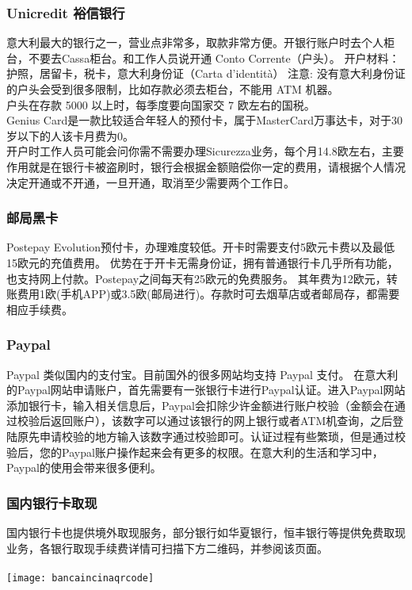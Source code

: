 \subsubsection{Unicredit 裕信银行}
意大利最大的银行之一，营业点非常多，取款非常方便。开银行账户时去个人柜台，不要去Cassa柜台。和工作人员说开通 Conto Corrente（户头）。
开户材料：护照，居留卡，税卡，意大利身份证（Carta d'identità）
注意:
没有意大利身份证的户头会受到很多限制，比如存款必须去柜台，不能用 ATM 机器。\\
户头在存款 5000 以上时，每季度要向国家交 7 欧左右的国税。\\
Genius Card是一款比较适合年轻人的预付卡，属于MasterCard万事达卡，对于30岁以下的人该卡月费为0。\\
开户时工作人员可能会问你需不需要办理Sicurezza业务，每个月14.8欧左右，主要作用就是在银行卡被盗刷时，银行会根据金额赔偿你一定的费用，请根据个人情况决定开通或不开通，一旦开通，取消至少需要两个工作日。 
\subsubsection{邮局黑卡}

Postepay Evolution预付卡，办理难度较低。开卡时需要支付5欧元卡费以及最低15欧元的充值费用。
优势在于开卡无需身份证，拥有普通银行卡几乎所有功能，也支持网上付款。Postepay之间每天有25欧元的免费服务。
其年费为12欧元，转账费用1欧(手机APP)或3.5欧(邮局进行)。存款时可去烟草店或者邮局存，都需要相应手续费。

\subsubsection{Paypal}

Paypal 类似国内的支付宝。目前国外的很多网站均支持 Paypal 支付。
在意大利的Paypal网站申请账户，首先需要有一张银行卡进行Paypal认证。进入Paypal网站添加银行卡，输入相关信息后，Paypal会扣除少许金额进行账户校验（金额会在通过校验后返回账户），该数字可以通过该银行的网上银行或者ATM机查询，之后登陆原先申请校验的地方输入该数字通过校验即可。认证过程有些繁琐，但是通过校验后，您的Paypal账户操作起来会有更多的权限。在意大利的生活和学习中，Paypal的使用会带来很多便利。

\subsubsection{国内银行卡取现}
国内银行卡也提供境外取现服务，部分银行如华夏银行，恒丰银行等提供免费取现业务，各银行取现手续费详情可扫描下方二维码，并参阅该页面。\\
\\
\texttt{[image: bancaincinaqrcode]}

